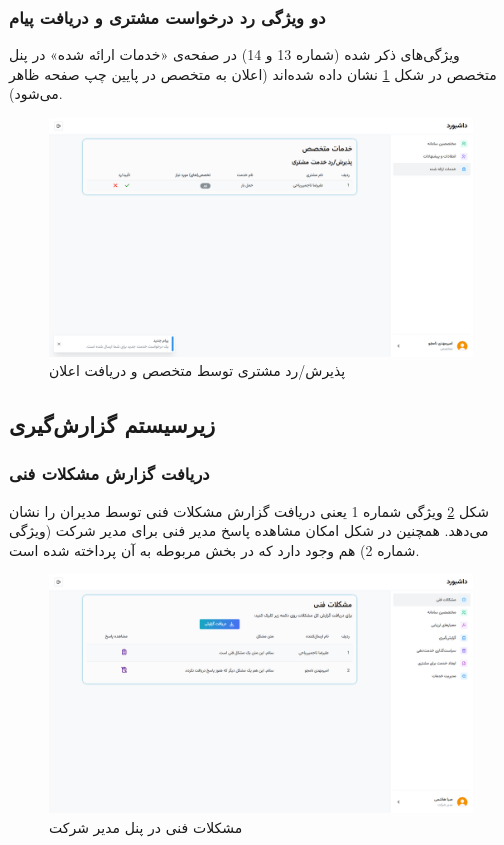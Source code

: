 \subsubsection{دو ویژگی رد درخواست مشتری و دریافت پیام}
ویژگی‌های ذکر شده (شماره 13 و 14) در صفحه‌ی «خدمات ارائه شده» در پنل متخصص در شکل
\ref{spec-request-notif}
نشان داده شده‌اند (اعلان به متخصص در پایین چپ صفحه ظاهر می‌شود).

\begin{figure}[h]
	\centering
	\includegraphics[width=\textwidth]{figs/initial-ui/spec-request-notif}
	\caption{پذیرش/رد مشتری توسط متخصص و دریافت اعلان}
	\label{spec-request-notif}
\end{figure}

\subsection{زیرسیستم گزارش‌گیری}

\subsubsection{دریافت گزارش مشکلات فنی}
شکل
\ref{mngr-tech-report}
ویژگی شماره 1 یعنی دریافت گزارش مشکلات فنی توسط مدیران را نشان می‌دهد. همچنین در شکل امکان مشاهده پاسخ مدیر فنی برای مدیر شرکت (ویژگی شماره 2) هم وجود دارد که در بخش مربوطه به آن پرداخته شده است.

\begin{figure}[h]
	\centering
	\includegraphics[width=\textwidth]{figs/initial-ui/mngr-tech-report}
	\caption{مشکلات فنی در پنل مدیر شرکت}
	\label{mngr-tech-report}
\end{figure}


